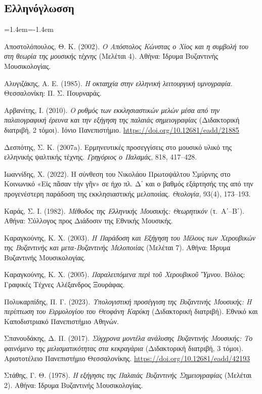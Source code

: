 \documentclass[11pt,a4paper]{article}
\newenvironment{reflist}{\begin{list}{}{\leftmargin=1.4em\itemindent=-1.4em\itemsep=0.8pt\parsep=0pt}\small}{\end{list}}
\begin{document}
\subsection*{Ελληνόγλωσση}
\begin{reflist}
\item Αποστολόπουλος, Θ. Κ. (2002). \emph{Ο Απόστολος Κώνστας ο Χίος και η συμβολή του στη θεωρία της μουσικής τέχνης} (Μελέται 4). Αθήνα: Ίδρυμα Βυζαντινής Μουσικολογίας.
\item Αλυγιζάκης, Α. Ε. (1985). \emph{Η οκταηχία στην ελληνική λειτουργική υμνογραφία}. Θεσσαλονίκη: Π. Σ. Πουρναράς.
\item Αρβανίτης, Ι. (2010). \emph{Ο ρυθμός των εκκλησιαστικών μελών μέσα από την παλαιογραφική έρευνα και την εξήγηση της παλαιάς σημειογραφίας} (Διδακτορική διατριβή, 2 τόμοι). Ιόνιο Πανεπιστήμιο. \url{https://doi.org/10.12681/eadd/21885}
\item Δεσπότης, Σ. Κ. (2007a). Ερμηνευτικές προσεγγίσεις στο μουσικό υλικό της ελληνικής ψαλτικής τέχνης. \emph{Γρηγόριος ο Παλαμάς}, 818, 417--428.
\item Ιωαννίδης, Χ. (2022). Η σύνθεση του Νικολάου Πρωτοψάλτου Σμύρνης στο Κοινωνικό «Εἰς πᾶσαν τὴν γῆν» σε ήχο πλ. Δ΄ και ο βαθμός εξάρτησής της από την προγενέστερη παράδοση της εκκλησιαστικής μελοποιίας. \emph{Θεολογία}, 93(4), 173--193.
\item Καράς, Σ. Ι. (1982). \emph{Μέθοδος της Ελληνικής Μουσικής: Θεωρητικόν} (τ.~Α΄--Β΄). Αθήνα: Σύλλογος προς Διάδοσιν της Εθνικής Μουσικής.
\item Καραγκούνης, Κ. Χ. (2003). \emph{Η Παράδοση και Εξήγηση του Μέλους των Χερουβικών της Βυζαντινής και μετα-Βυζαντινής Μελοποιίας} (Μελέται 7). Αθήνα: Ίδρυμα Βυζαντινής Μουσικολογίας.
\item Καραγκούνης, Κ. Χ. (2005). \emph{Παραλειπόμενα περὶ τοῦ Χερουβικοῦ Ὕμνου}. Βόλος: Γραφικές Τέχνες Αλέξανδρος Ξουράφας.
\item Πολυκαρπίδης, Π. Γ. (2023). \emph{Υπολογιστική προσέγγιση της Βυζαντινής Μουσικής: Η περίπτωση του Ειρμολογίου του Θεοφάνη Καρύκη} (Διδακτορική διατριβή). Εθνικό και Καποδιστριακό Πανεπιστήμιο Αθηνών.
\item Σπανουδάκης, Δ. Π. (2017). \emph{Σύγχρονα μοντέλα ανάλυσης Βυζαντινής Μουσικής: Το φαινόμενο της μελισματικότητας στα κεκραγάρια} (Διδακτορική διατριβή, 3 τόμοι). Αριστοτέλειο Πανεπιστήμιο Θεσσαλονίκης. \url{https://doi.org/10.12681/eadd/42193}
\item Στάθης, Γ. Θ. (1978). \emph{Η εξήγησις της Παλαιάς Βυζαντινής Σημειογραφίας} (Μελέται 2). Αθήνα: Ίδρυμα Βυζαντινής Μουσικολογίας.

\end{reflist}
\end{document}
